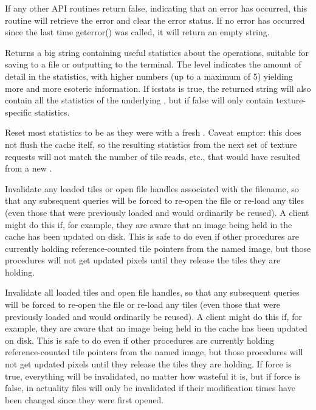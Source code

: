 If any other API routines return {\cf false}, indicating that an
error has occurred, this routine will retrieve the error and clear
the error status.  If no error has occurred since the last time
{\cf geterror()} was called, it will return an empty string.
\apiend

Returns a big string containing useful statistics about the \ImageCache
operations, suitable for saving to a file or outputting to the terminal.
The {\cf level} indicates the amount of detail in the statistics,
with higher numbers (up to a maximum of 5) yielding more and more
esoteric information.  If {\cf icstats} is true, the returned string
will also contain all the statistics of the underlying \ImageCache,
but if false will only contain texture-specific statistics.
\apiend

Reset most statistics to be as they were with a fresh
\ImageCache.  Caveat emptor: this does not flush the cache
itelf, so the resulting statistics from the next set of texture
requests will not match the number of tile reads, etc., that
would have resulted from a new \ImageCache.
\apiend

Invalidate any loaded tiles or open file handles associated with
the filename, so that any subsequent queries will be forced to
re-open the file or re-load any tiles (even those that were
previously loaded and would ordinarily be reused).  A client
might do this if, for example, they are aware that an image
being held in the cache has been updated on disk.  This is safe
to do even if other procedures are currently holding 
reference-counted tile pointers from the named image, but those 
procedures will not get updated pixels until they release the 
tiles they are holding.
\apiend

Invalidate all loaded tiles and open file handles, so that any
subsequent queries will be forced to re-open the file or re-load any
tiles (even those that were previously loaded and would ordinarily be
reused).  A client might do this if, for example, they are aware that an
image being held in the cache has been updated on disk.  This is safe to
do even if other procedures are currently holding reference-counted tile
pointers from the named image, but those procedures will not get updated
pixels until they release the tiles they are holding.  If force is true,
everything will be invalidated, no matter how wasteful it is, but if
force is false, in actuality files will only be invalidated if their
modification times have been changed since they were first opened.
\apiend

